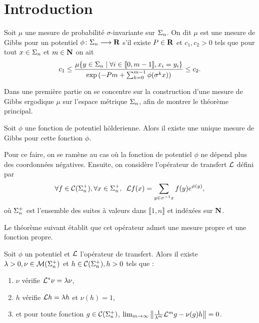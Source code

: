 \section{Introduction}

  \begin{definition}
    Soit $\mu$ une mesure de probabilité $\sigma$-invariante sur $\s_n$.
    On dit $\mu$ est une mesure de Gibbs pour un potentiel $\phi \colon \s_n \longrightarrow \R$ s'il existe $P \in \R$ et $c_1, c_2 > 0$ tels que
    pour tout $x \in \s_n$ et $m \in \N$ on ait
    $$c_1 \leq \frac{\mu\{y \in \s_n \mid \forall i \in \llbracket 0, m-1 \rrbracket, x_i = y_i\}}{\exp{(-Pm + \sum_{k=0}^{m-1}\phi(\sigma^kx))}} \leq c_2.$$
  \end{definition}

  Dans une première partie on se concentre sur la construction d'une mesure de Gibbs ergodique $\mu$ sur l'espace métrique $\s_n$,
  afin de montrer le théorème principal.

  \begin{theorem}
    Soit $\phi$ une fonction de potentiel hölderienne. Alors il existe une unique mesure de Gibbs pour cette fonction $\phi$.
  \end{theorem}

  Pour ce faire, on se ramène au cas où la fonction de potentiel $\phi$ ne dépend plus des coordonnées négatives.
  Ensuite, on considère l'opérateur de transfert $\L$ défini par
  $$\forall f \in \Csp{n}, \forall x \in \sp_n, \hspace{0.5em} \L f(x) = \sum_{y \in \sigma^{-1}x}f(y)e^{\phi(y)},$$
  où $\sp_n$ est l'ensemble des suites à valeurs dans $\llbracket 1, n\rrbracket$ et indéxées sur $\N$.

  Le théorème suivant établit que cet opérateur admet une mesure propre et une fonction propre.

  \begin{theorem}
    Soit $\phi$ un potentiel et $\L$ l'opérateur de transfert.
    Alors il existe $\lambda > 0, \nu \in \Msp{n}$ et $h \in \Csp{n}, h > 0$ tels que :
    \begin{enumerate}
      \item $\nu$ vérifie $\L^*\nu = \lambda\nu$,
      \item $h$ vérifie $\L h = \lambda h$ et $\nu(h) = 1$,
      \item et pour toute fonction $g \in \Csp{n}$,
	$\lim_{m\to\infty}\No{\frac 1 {\lambda^m} \L^mg - \nu(g)h} = 0$.
    \end{enumerate}
  \end{theorem}

